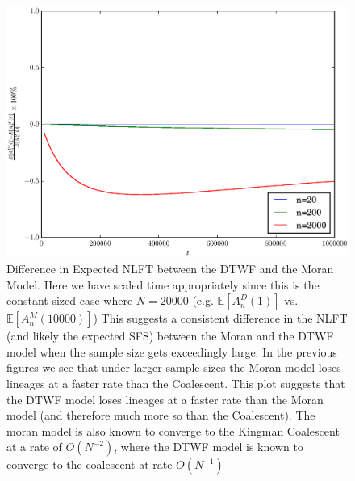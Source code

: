 \documentclass[11pt]{article}
\begin{document}
\begin{center}
	\begin{figure}[!ht]
		\begin{center}
			\includegraphics[scale=0.80]{../plots/moran_figure5}
		\end{center}
		\caption{Difference in Expected NLFT between the DTWF and the Moran Model. Here we have scaled time appropriately since this is the constant sized case where $N=20000$ (e.g. $\mathbb{E}[A_n^D(1)]$ vs. $\mathbb{E}[A_n^{M}(10000)]$) This suggests a consistent difference in the NLFT (and likely the expected SFS) between the Moran and the DTWF model when the sample size gets exceedingly large. In the previous figures we see that under larger sample sizes the Moran model loses lineages at a faster rate than the Coalescent. This plot suggests that the DTWF model loses lineages at a faster rate than the Moran model (and therefore much more so than the Coalescent). The moran model is also known to converge to the Kingman Coalescent at a rate of $O(N^{-2})$, where the DTWF model is known to converge to the coalescent at rate $O(N^{-1})$}
	\end{figure}
\end{center}
\end{document}
